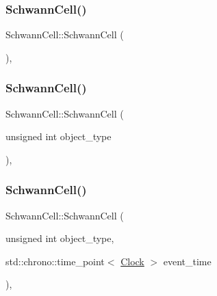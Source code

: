 \subsubsection{\texorpdfstring{Schwann\+Cell()}{SchwannCell()}\hspace{0.1cm}{\footnotesize\ttfamily [1/4]}}
{\footnotesize\ttfamily Schwann\+Cell\+::\+Schwann\+Cell (\begin{DoxyParamCaption}{ }\end{DoxyParamCaption})\hspace{0.3cm}{\ttfamily [inline]}, {\ttfamily [private]}}

\mbox{\label{classSchwannCell_a1387a5d8b87e485a507c72a657ab2864}} 
\subsubsection{\texorpdfstring{Schwann\+Cell()}{SchwannCell()}\hspace{0.1cm}{\footnotesize\ttfamily [2/4]}}
{\footnotesize\ttfamily Schwann\+Cell\+::\+Schwann\+Cell (\begin{DoxyParamCaption}\item[{unsigned int}]{object\+\_\+type }\end{DoxyParamCaption})\hspace{0.3cm}{\ttfamily [inline]}, {\ttfamily [private]}}

\mbox{\label{classSchwannCell_ad8e9f6343a3617a44d8a03e4edbc92d6}} 
\subsubsection{\texorpdfstring{Schwann\+Cell()}{SchwannCell()}\hspace{0.1cm}{\footnotesize\ttfamily [3/4]}}
{\footnotesize\ttfamily Schwann\+Cell\+::\+Schwann\+Cell (\begin{DoxyParamCaption}\item[{unsigned int}]{object\+\_\+type,  }\item[{std\+::chrono\+::time\+\_\+point$<$ \mbox{\hyperlink{universe_8h_a0ef8d951d1ca5ab3cfaf7ab4c7a6fd80}{Clock}} $>$}]{event\+\_\+time }\end{DoxyParamCaption})\hspace{0.3cm}{\ttfamily [inline]}, {\ttfamily [private]}}

